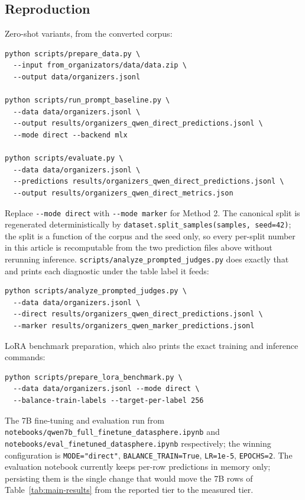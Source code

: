 \documentclass{zapiski}
\begin{document}
\subsection{Reproduction}
\label{sec:appendix-repro}

Zero-shot variants, from the converted corpus:

\begin{verbatim}
python scripts/prepare_data.py \
  --input from_organizators/data/data.zip \
  --output data/organizers.jsonl

python scripts/run_prompt_baseline.py \
  --data data/organizers.jsonl \
  --output results/organizers_qwen_direct_predictions.jsonl \
  --mode direct --backend mlx

python scripts/evaluate.py \
  --data data/organizers.jsonl \
  --predictions results/organizers_qwen_direct_predictions.jsonl \
  --output results/organizers_qwen_direct_metrics.json
\end{verbatim}

Replace \texttt{-{}-mode direct} with \texttt{-{}-mode marker} for Method 2.
The canonical split is regenerated deterministically by
\texttt{dataset.split\_samples(samples, seed=42)}; the split is a function of
the corpus and the seed only, so every per-split number in this article is
recomputable from the two prediction files above without rerunning inference.
\texttt{scripts/analyze\_prompted\_judges.py} does exactly that and prints
each diagnostic under the table label it feeds:

\begin{verbatim}
python scripts/analyze_prompted_judges.py \
  --data data/organizers.jsonl \
  --direct results/organizers_qwen_direct_predictions.jsonl \
  --marker results/organizers_qwen_marker_predictions.jsonl
\end{verbatim}

LoRA benchmark preparation, which also prints the exact training and
inference commands:

\begin{verbatim}
python scripts/prepare_lora_benchmark.py \
  --data data/organizers.jsonl --mode direct \
  --balance-train-labels --target-per-label 256
\end{verbatim}

The 7B fine-tuning and evaluation run from
\texttt{notebooks/qwen7b\_full\_finetune\_datasphere.ipynb} and
\texttt{notebooks/eval\_finetuned\_datasphere.ipynb} respectively; the winning
configuration is \texttt{MODE="direct"}, \texttt{BALANCE\_TRAIN=True},
\texttt{LR=1e-5}, \texttt{EPOCHS=2}. The evaluation notebook currently keeps
per-row predictions in memory only; persisting them is the single change that
would move the 7B rows of Table~\ref{tab:main-results} from the reported tier
to the measured tier.
\end{document}
